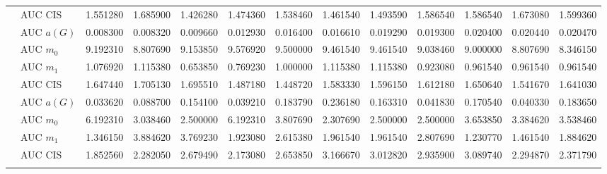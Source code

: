 \begin{table}[htbp]
\begin{tabular}{llrrrrrrrrrrr}
    & AUC CIS & 1.551280 & 1.685900 & 1.426280 & 1.474360 & 1.538460 & 1.461540 & 1.493590 & 1.586540 & 1.586540 & 1.673080 & 1.599360 \\
    \addlinespace
    \multirow{4}{*}{degree} & AUC $a(G)$ & 0.008300 & 0.008320 & 0.009660 & 0.012930 & 0.016400 & 0.016610 & 0.019290 & 0.019300 & 0.020400 & 0.020440 & 0.020470 \\
    & AUC $m_0$ & 9.192310 & 8.807690 & 9.153850 & 9.576920 & 9.500000 & 9.461540 & 9.461540 & 9.038460 & 9.000000 & 8.807690 & 8.346150 \\
    & AUC $m_1$ & 1.076920 & 1.115380 & 0.653850 & 0.769230 & 1.000000 & 1.115380 & 1.115380 & 0.923080 & 0.961540 & 0.961540 & 0.961540 \\
    & AUC CIS & 1.647440 & 1.705130 & 1.695510 & 1.487180 & 1.448720 & 1.583330 & 1.596150 & 1.612180 & 1.650640 & 1.541670 & 1.641030 \\
    \addlinespace
    \multirow{4}{*}{random} & AUC $a(G)$ & 0.033620 & 0.088700 & 0.154100 & 0.039210 & 0.183790 & 0.236180 & 0.163310 & 0.041830 & 0.170540 & 0.040330 & 0.183650 \\
    & AUC $m_0$ & 6.192310 & 3.038460 & 2.500000 & 6.192310 & 3.807690 & 2.307690 & 2.500000 & 2.500000 & 3.653850 & 3.384620 & 3.538460 \\
    & AUC $m_1$ & 1.346150 & 3.884620 & 3.769230 & 1.923080 & 2.615380 & 1.961540 & 1.961540 & 2.807690 & 1.230770 & 1.461540 & 1.884620 \\
    & AUC CIS & 1.852560 & 2.282050 & 2.679490 & 2.173080 & 2.653850 & 3.166670 & 3.012820 & 2.935900 & 3.089740 & 2.294870 & 2.371790 \\
    \addlinespace
    \bottomrule
  \end{tabular}
\end{table}

